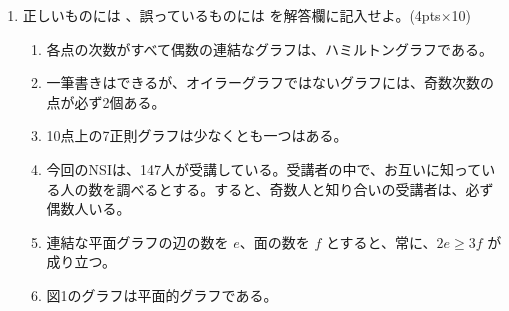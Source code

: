 \begin{enumerate}
\item 正しいものには \maru、誤っているものには \batsu を解答欄に記入せよ。\hfill(4pts$\times$10)
	\begin{enumerate}
	\item 各点の次数がすべて偶数の連結なグラフは、ハミルトングラフである。
	\item 一筆書きはできるが、オイラーグラフではないグラフには、奇数次数の点が必ず2個ある。
	\item 10点上の7正則グラフは少なくとも一つはある。
	\item 今回のNSIは、147人が受講している。受講者の中で、お互いに知っている人の数を調べるとする。すると、奇数人と知り合いの受講者は、必ず偶数人いる。
	\item 連結な平面グラフの辺の数を $e$、面の数を $f$ とすると、常に、$2e \geq 3f$ が成り立つ。
	\item 図1のグラフは平面的グラフである。


\end{enumerate}
\end{enumerate}
